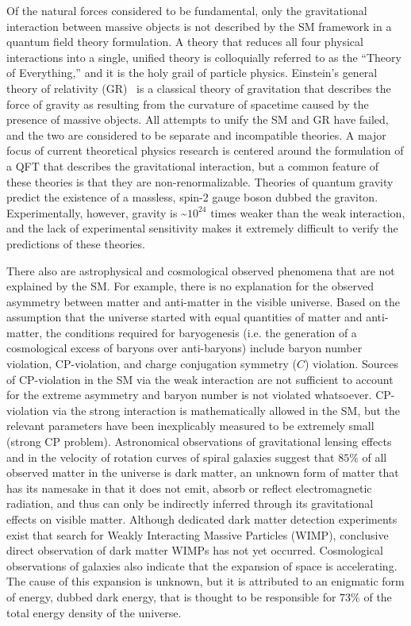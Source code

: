 Of the natural forces considered to be fundamental, only the gravitational interaction between massive objects is not described by the SM framework in a quantum field theory formulation.
A theory that reduces all four physical interactions into a single, unified theory is colloquially referred to as the ``Theory of Everything,'' and it is the holy grail of particle physics.
Einstein's general theory of relativity (GR)~\cite{einstein1915feldgleichungen} is a classical theory of gravitation that describes the force of gravity as resulting from the curvature of spacetime caused by the presence of massive objects.
All attempts to unify the SM and GR have failed, and the two are considered to be separate and incompatible theories.
A major focus of current theoretical physics research is centered around the formulation of a QFT that describes the gravitational interaction, but a common feature of these theories is that they are non-renormalizable.
Theories of quantum gravity predict the existence of a massless, spin-2 gauge boson dubbed the graviton.
Experimentally, however, gravity is \sim$10^{24}$ times weaker than the weak interaction, and the lack of experimental sensitivity makes it extremely difficult to verify the predictions of these theories.

There also are astrophysical and cosmological observed phenomena that are not explained by the SM.
For example, there is no explanation for the observed asymmetry between matter and anti-matter in the visible universe.
Based on the assumption that the universe started with equal quantities of matter and anti-matter, the conditions required for baryogenesis (i.e. the generation of a cosmological excess of baryons over anti-baryons) include baryon number violation, CP-violation, and charge conjugation symmetry ($C$) violation.
Sources of CP-violation in the SM via the weak interaction are not sufficient to account for the extreme asymmetry and baryon number is not violated whatsoever.
CP-violation via the strong interaction is mathematically allowed in the SM, but the relevant parameters have been inexplicably measured to be extremely small (strong CP problem).
Astronomical observations of gravitational lensing effects and in the velocity of rotation curves of spiral galaxies suggest that $85 \%$ of all observed matter in the universe is dark matter, an unknown form of matter that has its namesake in that it does not emit, absorb or reflect electromagnetic radiation, and thus can only be indirectly inferred through its gravitational effects on visible matter.
Although dedicated dark matter detection experiments exist that search for Weakly Interacting Massive Particles (WIMP), conclusive direct observation of dark matter WIMPs has not yet occurred.
Cosmological observations of galaxies also indicate that the expansion of space is accelerating.
The cause of this expansion is unknown, but it is attributed to an enigmatic form of energy, dubbed dark energy, that is thought to be responsible for $73 \%$ of the total energy density of the universe.

